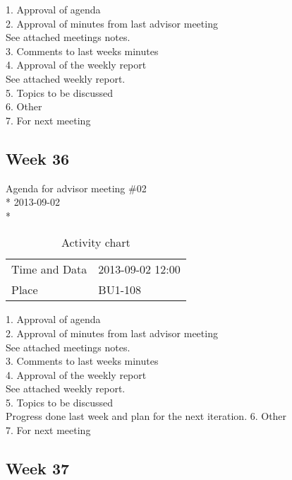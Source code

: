 1. Approval of agenda \\
2. Approval of minutes from last advisor meeting \\
See attached meetings notes. \\
3. Comments to last weeks minutes \\
4. Approval of the weekly report \\
See attached weekly report. \\
5. Topics to be discussed \\
6. Other \\
7. For next meeting \\

\newpage
\subsection{Week 36}

\begin{center}
Agenda for advisor meeting \#02\\*
2013-09-02\\*
\end{center}

\begin{table}[H]
\begin{center}
\begin{tabular}{ l | l }
Time and Data & 2013-09-02 12:00 \\
Place & BU1-108 \\
\end{tabular}
\end{center}
\caption{Activity chart}
\label{table:activityChartAdvisorAgendaWeek36}
\end{table}


1. Approval of agenda \\
2. Approval of minutes from last advisor meeting \\
See attached meetings notes. \\
3. Comments to last weeks minutes \\
4. Approval of the weekly report \\
See attached weekly report. \\
5. Topics to be discussed \\
Progress done last week and plan for the next iteration.
6. Other \\
7. For next meeting \\

\newpage
\subsection{Week 37}

